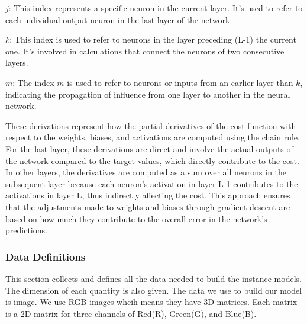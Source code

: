 \documentclass[12pt]{article}
\begin{document}
$j$: This index represents a specific neuron in the current layer. 
It's used to refer to each individual output neuron in the last layer of the network.

$k$: This index is used to refer to neurons in the layer preceding 
(L-1) the current one. It's involved in calculations that connect the neurons of two consecutive layers.

$m$: The index $m$ is used to refer to neurons or inputs from an earlier layer than $k$, 
indicating the propagation of influence from one layer to another in the neural network.

These derivations represent how the partial derivatives of the cost function with respect 
to the weights, biases, and activations are computed using the chain rule. For the last layer, 
these derivations are direct and involve the actual outputs of the network compared to the 
target values, which directly contribute to the cost. In other layers, the derivatives are 
computed as a sum over all neurons in the subsequent layer because each neuron's activation in 
layer L-1 contributes to the activations in layer L, thus indirectly affecting the cost. This 
approach ensures that the adjustments made to weights and biases through gradient descent are 
based on how much they contribute to the overall error in the network's predictions.


\subsubsection{Data Definitions}\label{sec_datadef}



This section collects and defines all the data needed to build the instance
models. The dimension of each quantity is also given.  
The data we use to build our model is image. We use RGB images whcih means they have 3D matrices.
Each matrix is a 2D matrix for three channels of Red(R), Green(G), and Blue(B).
\end{document}
